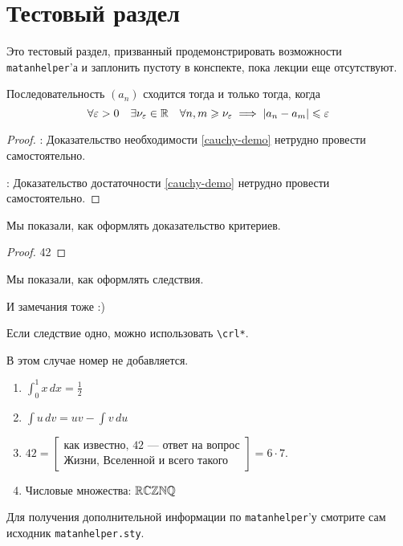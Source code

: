 \documentclass[../../main.tex]{subfiles}
\begin{document}
\section{Тестовый раздел}

Это тестовый раздел, призванный продемонстрировать возможности 
\texttt{matanhelper}'а и заплонить пустоту в конспекте, пока лекции еще 
отсутствуют.

\begin{thm} Последовательность $(a_n)$ сходится тогда и только 
тогда, когда
\begin{equation}
\forall \varepsilon > 0 \quad \exists \nu_\varepsilon \in \mathbb{R} \quad \forall n, m \geqslant \nu_\varepsilon 
\implies \left|{a_n - a_m}\right| \leqslant \varepsilon
\label{cauchy-demo}
\end{equation}
\end{thm}
\begin{proof}
 \;

 \nec: Доказательство необходимости \eqref{cauchy-demo} нетрудно провести 
 самостоятельно.
 
 \suff: Доказательство достаточности \eqref{cauchy-demo} нетрудно провести 
 самостоятельно.
\end{proof}

\begin{crl}
 Мы показали, как оформлять доказательство критериев.
\end{crl}

\begin{proof}
 42
\end{proof}

\begin{crl}
 Мы показали, как оформлять следствия.
\end{crl}

\begin{rem}
 И замечания тоже :)
\end{rem}

\begin{thm}
 Если следствие одно, можно использовать \texttt{\textbackslash crl*}.
\end{thm}

\begin{crl*}
 В этом случае номер не добавляется.
\end{crl*}

\begin{exmps}
\begin{enumerate}
 \;

 \item $\displaystyle \int_0^1 x\,dx = \frac12$
 
 \item $\displaystyle \int u\,dv = uv - \int v\,du$
 
 \item $42 = \left[\begin{array}{c}\text{как известно, $42$~--- ответ на 
 вопрос} \\ \text{Жизни, Вселенной и всего такого}\end{array}\right] = 6\cdot 
 7$.
 
 \item Числовые множества: $\mathbb{R} \mathbb{C} \mathbb{Z} \mathbb{N} \mathbb{Q}$
\end{enumerate}
\end{exmps}

\begin{lem}
 Для получения дополнительной информации по \texttt{matanhelper}'у смотрите 
 сам исходник \texttt{matanhelper.sty}.
\end{lem}
\end{document}
